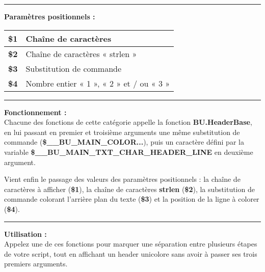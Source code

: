 \documentclass[a4paper,10pt]{article}
\begin{document}
\par\noindent\rule{\textwidth}{0.4pt}

\begin{justify}
    \textbf{Paramètres positionnels :}\\[1\baselineskip]
    \begin{tabular}{|l|l|}
        \hline
        \textbf{\color{vars}\$1} & Chaîne de caractères\\
        \hline
        \textbf{\color{vars}\$2} & Chaîne de caractères « strlen »\\
        \hline
        \textbf{\color{vars}\$3} & Substitution de commande\\
        \hline
        \textbf{\color{vars}\$4} & Nombre entier « 1 », « 2 » et / ou « 3 »\\
        \hline
    \end{tabular}
\end{justify}

\setlength{\parskip}{2em}
\par\noindent\rule{\textwidth}{0.4pt}\setlength{\parskip}{1em}

\begin{justify}
    \textbf{Fonctionnement :}\\[1\baselineskip]
    Chacune des fonctions de cette catégorie appelle la fonction \textbf{\color{func}BU.HeaderBase}, en lui passant en premier et troisième arguments une même substitution de commande (\textbf{\color{vars}\$\_\_BU\_MAIN\_COLOR...}), puis un caractère défini par la variable \textbf{\color{vars}\$\_\_BU\_MAIN\_TXT\_CHAR\_HEADER\_LINE} en deuxième argument.
\end{justify}

\begin{justify}
    Vient enfin le passage des valeurs des paramètres positionnels : la chaîne de caractères à afficher (\textbf{\color{vars}\$1}), la chaîne de caractères \textbf{strlen} (\textbf{\color{vars}\$2}), la substitution de commande colorant l'arrière plan du texte (\textbf{\color{vars}\$3}) et la position de la ligne à colorer (\textbf{\color{vars}\$4}).
\end{justify}

\par\noindent\rule{\textwidth}{0.4pt}

\begin{justify}
    \textbf{Utilisation :}\\[1\baselineskip]
    Appelez une de ces fonctions pour marquer une séparation entre plusieurs étapes de votre script, tout en affichant un header unicolore sans avoir à passer ses trois premiers arguments.
\end{justify}
\end{document}
